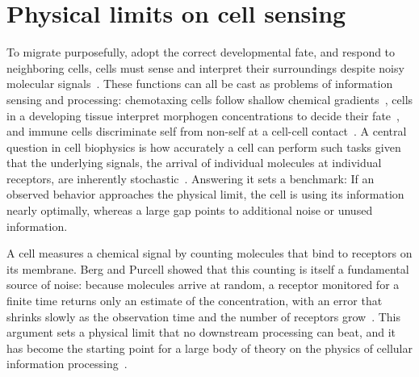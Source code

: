 \section{Physical limits on cell sensing}
\label{sec:ch1:sensing}

To migrate purposefully, adopt the correct developmental fate, and respond to neighboring cells, cells must sense and interpret their surroundings despite noisy molecular signals~\cite{sengupta2021principles}.
These functions can all be cast as problems of information sensing and processing: chemotaxing cells follow shallow chemical gradients~\cite{hu2010physical}, cells in a developing tissue interpret morphogen concentrations to decide their fate~\cite{rogers2011morphogen}, and immune cells discriminate self from non-self at a cell-cell contact~\cite{feinerman2008quantitative}.
A central question in cell biophysics is how accurately a cell can perform such tasks given that the underlying signals, the arrival of individual molecules at individual receptors, are inherently stochastic~\cite{berg1977physics}.
Answering it sets a benchmark: If an observed behavior approaches the physical limit, the cell is using its information nearly optimally, whereas a large gap points to additional noise or unused information.

A cell measures a chemical signal by counting molecules that bind to receptors on its membrane.
Berg and Purcell showed that this counting is itself a fundamental source of noise: because molecules arrive at random, a receptor monitored for a finite time returns only an estimate of the concentration, with an error that shrinks slowly as the observation time and the number of receptors grow~\cite{berg1977physics}.
This argument sets a physical limit that no downstream processing can beat, and it has become the starting point for a large body of theory on the physics of cellular information processing~\cite{bialek2005physical, ten2016fundamental, tkavcik2025information}.

